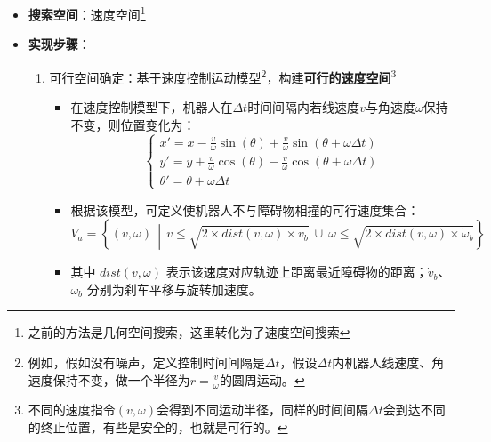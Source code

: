 \documentclass[../main.tex]{subfiles}
\begin{document}
\begin{enumerate}
\begin{itemize}
            \item \textbf{搜索空间}：速度空间\footnote{之前的方法是几何空间搜索，这里转化为了速度空间搜索}
            \item \textbf{实现步骤}：
                \begin{enumerate}
                    \item 可行空间确定：基于速度控制运动模型\footnote{例如，假如没有噪声，定义控制时间间隔是$\Delta t$，假设$\Delta t$内机器人线速度、角速度保持不变，做一个半径为$r=\frac{v}{\omega}$的圆周运动。}，构建\textbf{可行的速度空间}\footnote{不同的速度指令$(v,\omega)$会得到不同运动半径，同样的时间间隔$\Delta t$会到达不同的终止位置，有些是安全的，也就是可行的。}
                        \begin{itemize}
                            \item {\small\kaishu 在速度控制模型下，机器人在$\Delta t$时间间隔内若线速度$v$与角速度$\omega$保持不变，则位置变化为：}
                            \[
                            \begin{cases}
                            x' = x - \frac{v}{\omega}\sin(\theta) + \frac{v}{\omega}\sin(\theta + \omega \Delta t) \\
                            y' = y + \frac{v}{\omega}\cos(\theta) - \frac{v}{\omega}\cos(\theta + \omega \Delta t) \\
                            \theta' = \theta + \omega \Delta t
                            \end{cases}
                            \]
                            \item {\small\kaishu 根据该模型，可定义使机器人不与障碍物相撞的可行速度集合：}
                            \[
                            V_a = \left\{(v,\omega)\, \middle|\, v \le \sqrt{2 \times dist(v,\omega) \times \dot{v}_b}\ \cup\ \omega \le \sqrt{2 \times dist(v,\omega) \times \dot{\omega}_b}\right\}
                            \]
                            \item {\small\kaishu 其中 $dist(v,\omega)$ 表示该速度对应轨迹上距离最近障碍物的距离；$\dot{v}_b$、$\dot{\omega}_b$ 分别为刹车平移与旋转加速度。}
                        \end{itemize}
                

\end{enumerate}
\end{itemize}
\end{enumerate}
\end{document}
